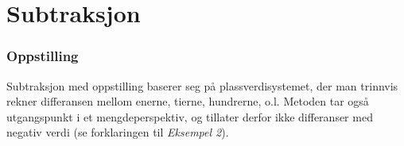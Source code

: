 \section{Subtraksjon}
\subsubsection{Oppstilling}
Subtraksjon med oppstilling baserer seg på plassverdisystemet, der man trinnvis rekner differansen mellom enerne, tierne, hundrerne, o.l. Metoden tar også utgangspunkt i et mengdeperspektiv, og tillater derfor ikke differanser med negativ verdi (se forklaringen til \textsl{Eksempel 2}).
\begin{center}
	\parbox{0.3\linewidth}{
} \qquad
\parbox{0.3\linewidth}{
} \\[12pt]
\parbox{0.3\linewidth}{
}\qquad
\parbox{0.3\linewidth}{
}

\end{center}
